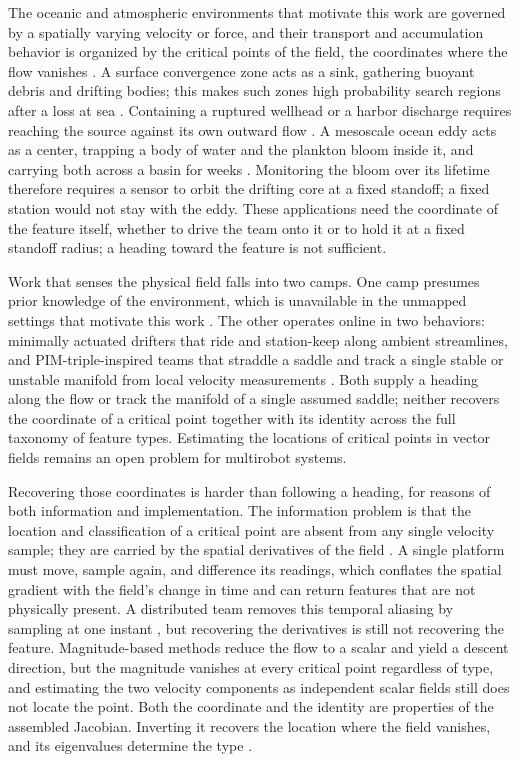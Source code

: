 \documentclass[lettersize,journal]{IEEEtran}
\begin{document}
The oceanic and atmospheric environments that motivate this work are governed by a spatially varying velocity or force, and their transport and accumulation behavior is organized by the critical points of the field, the coordinates where the flow vanishes \cite{32,36}. A surface convergence zone acts as a sink, gathering buoyant debris and drifting bodies; this makes such zones high probability search regions after a loss at sea \cite{37,38}. Containing a ruptured wellhead or a harbor discharge requires reaching the source against its own outward flow \cite{40,41}. A mesoscale ocean eddy acts as a center, trapping a body of water and the plankton bloom inside it, and carrying both across a basin for weeks \cite{43,44,45}. Monitoring the bloom over its lifetime therefore requires a sensor to orbit the drifting core at a fixed standoff; a fixed station would not stay with the eddy. These applications need the coordinate of the feature itself, whether to drive the team onto it or to hold it at a fixed standoff radius; a heading toward the feature is not sufficient.

Work that senses the physical field falls into two camps. One camp presumes prior knowledge of the environment, which is unavailable in the unmapped settings that motivate this work \cite{30,31}. The other operates online in two behaviors: minimally actuated drifters that ride and station-keep along ambient streamlines, and PIM-triple-inspired teams that straddle a saddle and track a single stable or unstable manifold from local velocity measurements \cite{23,32,33}. Both supply a heading along the flow or track the manifold of a single assumed saddle; neither recovers the coordinate of a critical point together with its identity across the full taxonomy of feature types. Estimating the locations of critical points in vector fields remains an open problem for multirobot systems.

Recovering those coordinates is harder than following a heading, for reasons of both information and implementation. The information problem is that the location and classification of a critical point are absent from any single velocity sample; they are carried by the spatial derivatives of the field \cite{46}. A single platform must move, sample again, and difference its readings, which conflates the spatial gradient with the field's change in time and can return features that are not physically present. A distributed team removes this temporal aliasing by sampling at one instant \cite{22,23,47}, but recovering the derivatives is still not recovering the feature. Magnitude-based methods \cite{48} reduce the flow to a scalar and yield a descent direction, but the magnitude vanishes at every critical point regardless of type, and estimating the two velocity components as independent scalar fields still does not locate the point. Both the coordinate and the identity are properties of the assembled Jacobian. Inverting it recovers the location where the field vanishes, and its eigenvalues determine the type \cite{36}.
\end{document}
